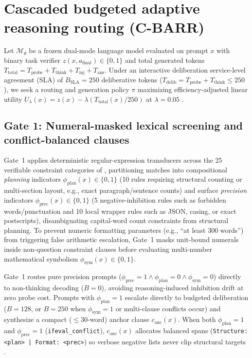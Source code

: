 \documentclass{article}
\begin{document}
\section{Cascaded budgeted adaptive reasoning routing (C-BARR)}
\label{sec:method}

Let $\mathcal{M}_\theta$ be a frozen dual-mode language model evaluated on prompt $x$ with binary task verifier $z(x, a_{\text{final}}) \in \{0, 1\}$ and total generated tokens $T_{\text{total}} = T_{\text{probe}} + T_{\text{think}} + T_{\text{inj}} + T_{\text{ans}}$. Under an interactive deliberation service-level agreement (SLA) of $B_{\text{SLA}} = 250$ deliberative tokens ($T_{\text{delib}} = T_{\text{probe}} + T_{\text{think}} \le 250$), we seek a routing and generation policy $\pi$ maximizing efficiency-adjusted linear utility $U_\lambda(x) = z(x) - \lambda (T_{\text{total}}(x) / 250)$ at $\lambda = 0.05$ \cite{aggarwal2025optimalthinkingbench,nguyen2026early}.

\subsection{Gate 1: Numeral-masked lexical screening and conflict-balanced clauses}
Gate~1 applies deterministic regular-expression transducers across the 25 verifiable constraint categories of \citet{zhou2023ifeval}, partitioning matches into compositional \emph{planning} indicators $\phi_{\text{plan}}(x) \in \{0, 1\}$ (10 rules requiring structural counting or multi-section layout, e.g., exact paragraph/sentence counts) and surface \emph{precision} indicators $\phi_{\text{prec}}(x) \in \{0, 1\}$ (5 negative-inhibition rules such as forbidden words/punctuation and 10 local wrapper rules such as JSON, casing, or exact postscripts), disambiguating capital-word count constraints from structural planning. To prevent numeric formatting parameters (e.g., ``at least 300 words'') from triggering false arithmetic escalation, Gate~1 masks unit-bound numerals inside non-question constraint clauses before evaluating multi-number mathematical symbolism $\phi_{\text{sym}}(x) \in \{0, 1\}$.

Gate~1 routes pure precision prompts ($\phi_{\text{prec}} = 1 \land \phi_{\text{plan}} = 0 \land \phi_{\text{sym}} = 0$) directly to non-thinking decoding ($B = 0$), avoiding reasoning-induced inhibition drift at zero probe cost. Prompts with $\phi_{\text{plan}} = 1$ escalate directly to budgeted deliberation ($B = 128$, or $B = 250$ when $\phi_{\text{sym}} = 1$ or multi-clause conflicts occur) and synthesize a compact ($\le 30$-word) anchor clause $c_{\text{anc}}(x)$. When both $\phi_{\text{plan}} = 1$ and $\phi_{\text{prec}} = 1$ (\texttt{ifeval\_conflict}), $c_{\text{anc}}(x)$ allocates balanced spans (\texttt{Structure: <plan> | Format: <prec>}) so verbose negative lists never clip structural targets \cite{zhao2026bridging}.
\end{document}
